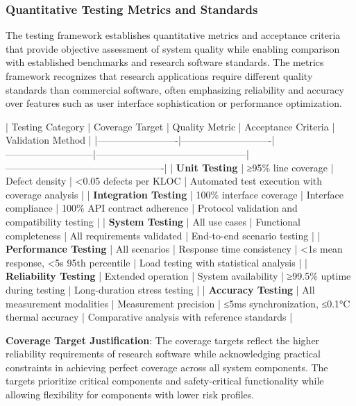 \documentclass[12pt,a4paper]{article}
\begin{document}
\subsubsection{Quantitative Testing Metrics and Standards}

The testing framework establishes quantitative metrics and acceptance criteria that provide objective assessment of
system quality while enabling comparison with established benchmarks and research software standards. The metrics
framework recognizes that research applications require different quality standards than commercial software, often
emphasizing reliability and accuracy over features such as user interface sophistication or performance optimization.

| Testing Category        | Coverage Target            | Quality Metric            | Acceptance Criteria                           | Validation Method                               |
|-------------------------|----------------------------|---------------------------|-----------------------------------------------|-------------------------------------------------|
| \textbf{Unit Testing}        | ≥95\% line coverage         | Defect density            | <0.05 defects per KLOC                        | Automated test execution with coverage analysis |
| \textbf{Integration Testing} | 100\% interface coverage    | Interface compliance      | 100\% API contract adherence                   | Protocol validation and compatibility testing   |
| \textbf{System Testing}      | All use cases              | Functional completeness   | All requirements validated                    | End-to-end scenario testing                     |
| \textbf{Performance Testing} | All scenarios              | Response time consistency | <1s mean response, <5s 95th percentile        | Load testing with statistical analysis          |
| \textbf{Reliability Testing} | Extended operation         | System availability       | ≥99.5\% uptime during testing                  | Long-duration stress testing                    |
| \textbf{Accuracy Testing}    | All measurement modalities | Measurement precision     | ≤5ms synchronization, ≤0.1°C thermal accuracy | Comparative analysis with reference standards   |

\textbf{Coverage Target Justification}: The coverage targets reflect the higher reliability requirements of research software
while acknowledging practical constraints in achieving perfect coverage across all system components. The targets
prioritize critical components and safety-critical functionality while allowing flexibility for components with lower
risk profiles.
\end{document}
